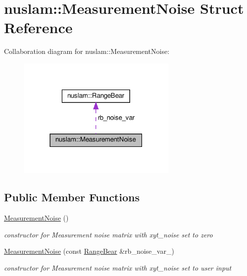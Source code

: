 \hypertarget{structnuslam_1_1MeasurementNoise}{}\section{nuslam\+:\+:Measurement\+Noise Struct Reference}
\label{structnuslam_1_1MeasurementNoise}


Collaboration diagram for nuslam\+:\+:Measurement\+Noise\+:
\nopagebreak
\begin{figure}[H]
\begin{center}
\leavevmode
\includegraphics[width=219pt]{d8/de3/structnuslam_1_1MeasurementNoise__coll__graph}
\end{center}
\end{figure}
\subsection*{Public Member Functions}
\begin{DoxyCompactItemize}
\item 
\mbox{\label{structnuslam_1_1MeasurementNoise_acad5ae4aedf60cfa75b7aa4432964010}} 
\hyperlink{structnuslam_1_1MeasurementNoise_acad5ae4aedf60cfa75b7aa4432964010}{Measurement\+Noise} ()
\begin{DoxyCompactList}\small\item\em constructor for Measurement noise matrix with xyt\+\_\+noise set to zero \end{DoxyCompactList}\item 
\mbox{\label{structnuslam_1_1MeasurementNoise_abfbe4352cca0d9e8416142ce442f207e}} 
\hyperlink{structnuslam_1_1MeasurementNoise_abfbe4352cca0d9e8416142ce442f207e}{Measurement\+Noise} (const \hyperlink{structnuslam_1_1RangeBear}{Range\+Bear} \&rb\+\_\+noise\+\_\+var\+\_\+)
\begin{DoxyCompactList}\small\item\em constructor for Measurement noise matrix with xyt\+\_\+noise set to user input \end{DoxyCompactList}\end{DoxyCompactItemize}
